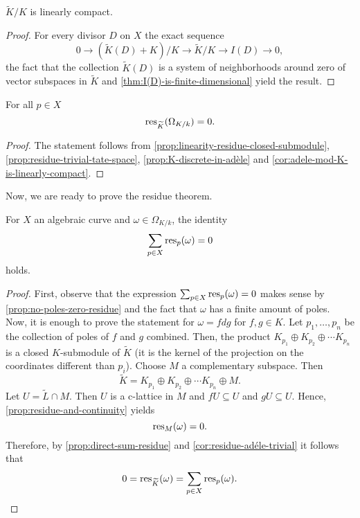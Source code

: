 \begin{corollary}\label{cor:adele-mod-K-is-linearly-compact}
	$\widetilde{K}/K$ is linearly compact.
\end{corollary}
\begin{proof}
	For every divisor $D$ on $X$ the exact sequence
	\[
	0 \to (\widetilde{K}(D) + K)/ K \to \widetilde{K}/K \to I(D) \to 0,
	\]
	the fact that the collection $\widetilde{K}(D)$ is a system of neighborhoods around zero of vector subspaces in $\widetilde{K}$ and \cref{thm:I(D)-is-finite-dimensional} yield the result.
\end{proof}
\begin{corollary}\label{cor:residue-adéle-trivial}
	For all $p\in X$
	\[
		\operatorname{res}_{\widetilde{K}}(\Omega_{K/k}) = 0.
	\]
\end{corollary}
\begin{proof}
	The statement follows from \cref{prop:linearity-residue-closed-submodule}, \cref{prop:residue-trivial-tate-space}, \cref{prop:K-discrete-in-adèle} and \cref{cor:adele-mod-K-is-linearly-compact}.
\end{proof}

Now, we are ready to prove the residue theorem. 
\begin{theorem}\label{thm:residue-theorem}
	For $X$ an algebraic curve and $\omega \in \Omega_{K/k}$, the identity 
	\[
		\sum_{p\in X}\operatorname{res}_{p}(\omega) = 0
	\]
	holds. 
\end{theorem}
\begin{proof}
	First, observe that the expression $\sum_{p\in X}\operatorname{res}_{p}(\omega) = 0$ makes sense by \cref{prop:no-poles-zero-residue} and the fact that $\omega$ has a finite amount of poles. Now, it is enough to prove the statement for $\omega = fdg$ for $f,g \in K$. Let $p_{1}, \ldots, p_{n}$ be the collection of poles of $f$ and $g$ combined. Then, the product $K_{p_{1}} \oplus K_{p_{2}} \oplus \cdots K_{p_{n}}$ is a closed $K$-submodule of $\widetilde{K}$ (it is the kernel of the projection on the coordinates different than $p_{i}$). Choose $M$ a complementary subspace. Then
	\[
		\widetilde{K} = K_{p_{1}} \oplus K_{p_{2}} \oplus \cdots K_{p_{n}} \oplus M. 
	\] 
	Let $U = \widetilde{L} \cap M$. Then $U$ is a c-lattice in $M$ and $fU \subseteq U$ and $gU \subseteq U$. Hence, \cref{prop:residue-and-continuity} yields
	\[
		\operatorname{res}_{M}(\omega) = 0.
	\]
	Therefore, by \cref{prop:direct-sum-residue} and \cref{cor:residue-adéle-trivial} it follows that
	\[
		0 = \operatorname{res}_{\widetilde{K}}(\omega) = \sum_{p\in X}\operatorname{res}_{p}(\omega).
	\]
\end{proof}

